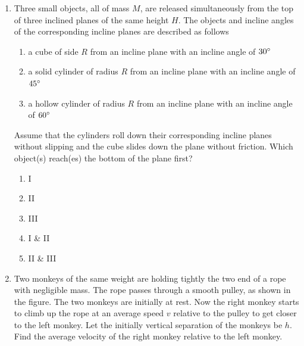 \documentclass[12pt,letterpaper]{article}
\begin{document}
\begin{enumerate}[resume]

\item
Three small objects, all of mass $M$, are released simultaneously from the top of three inclined planes of the same height $H$. The objects and incline angles of the corresponding incline planes are described as follows
\begin{enumerate}[label=\Roman*.]
\item a cube of side $R$ from an incline plane with an incline angle of $30\degree$
\item a solid cylinder of radius $R$ from an incline plane with an incline angle of $45\degree$
\item a hollow cylinder of radius $R$ from an incline plane with an incline angle of $60\degree$
\end{enumerate}
Assume that the cylinders roll down their corresponding incline planes without slipping and the cube slides down the plane without friction. Which object(s) reach(es) the bottom of the plane first?
\begin{enumerate}
\item I
\item II
\item III
\item I \& II
\item II \& III
\end{enumerate}

\vfill
\newpage

\item
Two monkeys of the same weight are holding tightly the two end of a rope with negligible mass. The rope passes through a smooth pulley, as shown in the figure. The two monkeys are initially at rest. Now the right monkey starts to climb up the rope at an average speed $v$ relative to the pulley to get closer to the left monkey. Let the initially vertical separation of the monkeys be $h$. Find the average velocity of the right monkey relative to the left monkey.


\end{enumerate}
\end{document}
